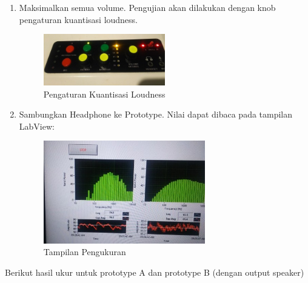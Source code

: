 \documentclass[12pt,]{article}
\begin{document}
\begin{enumerate}
		\item Maksimalkan semua volume. Pengujian akan dilakukan dengan knob pengaturan kuantisasi loudness.
		
		\begin{figure}[!ht]
			\centering
			\includegraphics[width=150pt]{images/loudset}
			\caption{Pengaturan Kuantisasi Loudness}
		\end{figure}
		
		\item Sambungkan Headphone ke Prototype.
		Nilai dapat dibaca pada tampilan LabView:
		
		\begin{figure}[!ht]
			\centering
			\includegraphics[width=200pt]{images/ni_ukur}
			\caption{Tampilan Pengukuran}
		\end{figure}
		
	\end{enumerate}

	\newpage
	Berikut hasil ukur untuk prototype A dan prototype B (dengan output speaker)
	
\end{document}
